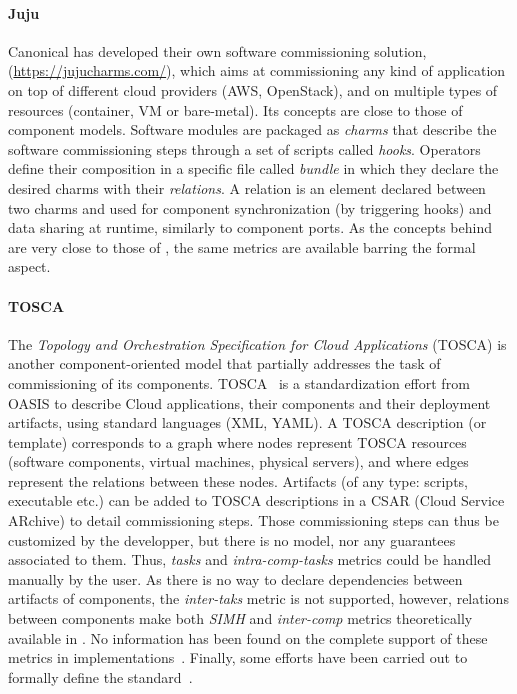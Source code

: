 \paragraph{Juju}
Canonical has developed their own software commissioning solution,
\juju (\url{https://jujucharms.com/}), which aims at commissioning any
kind of application on top of different cloud providers (\eg AWS,
OpenStack), and on multiple types of resources (container, VM or
bare-metal). Its concepts are close to those of component models. Software
modules are packaged as \juju \emph{charms} that describe the
software commissioning steps through a set of scripts called
\emph{hooks}. Operators define their composition in a specific file
called \emph{bundle} in which they declare the desired charms with
their \emph{relations}. A relation is an element declared between two
charms and used for component synchronization (by triggering hooks)
and data sharing at runtime, similarly to component ports. As the
concepts behind \juju are very close to those of \aeolus, the same
metrics are available barring the formal aspect.

\paragraph{TOSCA}
The \emph{Topology and Orchestration Specification for Cloud
  Applications} (TOSCA) is another component-oriented model that
partially addresses the task of commissioning of its
components. TOSCA~\cite{tosca:web,brogi2018} is a
standardization effort from OASIS to describe Cloud applications,
their components and their deployment artifacts, using standard
languages (\ie XML, YAML). A TOSCA description (or template)
corresponds to a graph where nodes represent TOSCA resources
(\eg software components, virtual machines, physical servers), and
where edges represent the relations between these nodes. Artifacts (of
any type: scripts, executable etc.) can be added to TOSCA descriptions
in a CSAR (Cloud Service ARchive) to detail commissioning steps. Those
commissioning steps can thus be customized by the developper, but there
is no model, nor any guarantees associated to them. Thus, \emph{tasks} and
\emph{intra-comp-tasks} metrics could be handled manually by the user. As
there is no way to declare dependencies between artifacts of
components, the \emph{inter-taks} metric is not supported, however,
relations between components make both \emph{SIMH} and
\emph{inter-comp} metrics theoretically available in \tosca. No
information has been found on the complete support of these metrics
in \tosca implementations~\cite{cloudify:web,opentosca:web}. Finally,
some efforts have been carried out to formally define the \tosca
standard~\cite{tosca:web}.

